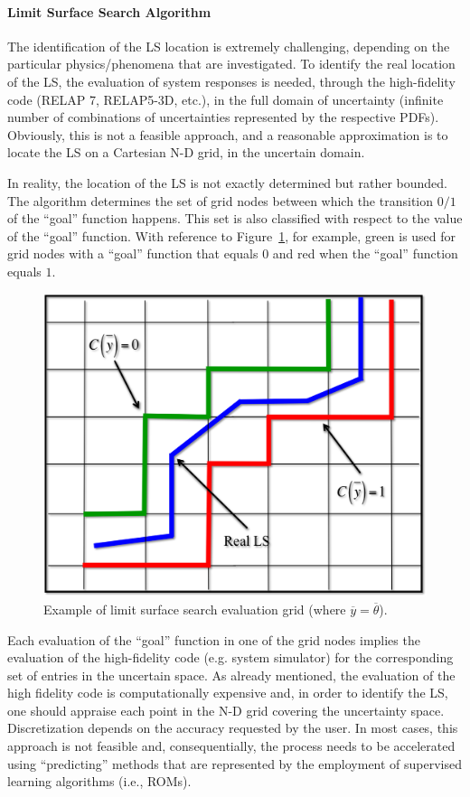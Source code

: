 \paragraph{Limit Surface Search Algorithm}
\label{par:LSSalgorithm}
The identification of the LS location is extremely challenging,
depending on the particular physics/phenomena that are investigated.
To identify the real location of the LS, the evaluation of system
responses is needed, through the high-fidelity code (RELAP 7,
RELAP5-3D, etc.), in the full domain of uncertainty (infinite number of
combinations of uncertainties represented by the respective PDFs).
Obviously, this is not a feasible approach, and a reasonable
approximation is to locate the LS on a Cartesian N-D grid, in the
uncertain domain.

In reality, the location of the LS is not exactly determined but rather
bounded. The algorithm determines the set of grid nodes between
which the transition $0/1$ of the ``goal'' function happens. This set is
also classified with respect to the value of the ``goal'' function. With
reference to Figure~\ref{fig:LSgoalFunctionExample}, for example,
green is used for grid nodes with a
``goal'' function that equals $0$ and red when the ``goal'' function
equals $1$.
\begin{figure}[h!]
  \centering
  \includegraphics[width=1.0\textwidth]  {pics/LSgoalFunctionExample.png}
  \caption{Example of limit surface search evaluation grid (where $\overline{y}=\overline{\theta}$).}
  \label{fig:LSgoalFunctionExample}
\end{figure}
Each evaluation of the ``goal'' function in one of the grid nodes implies
the evaluation of the high-fidelity code (e.g. system simulator) for the
corresponding set of entries in the uncertain space. As already
mentioned, the evaluation of the high fidelity code is computationally
expensive and, in order to identify the LS, one should appraise
each point in the N-D grid covering the uncertainty space.
Discretization depends on the accuracy requested by the user. In
most cases, this approach is not feasible and, consequentially, the
process needs to be accelerated using ``predicting'' methods that are
represented by the employment of supervised learning algorithms
(i.e., ROMs).

